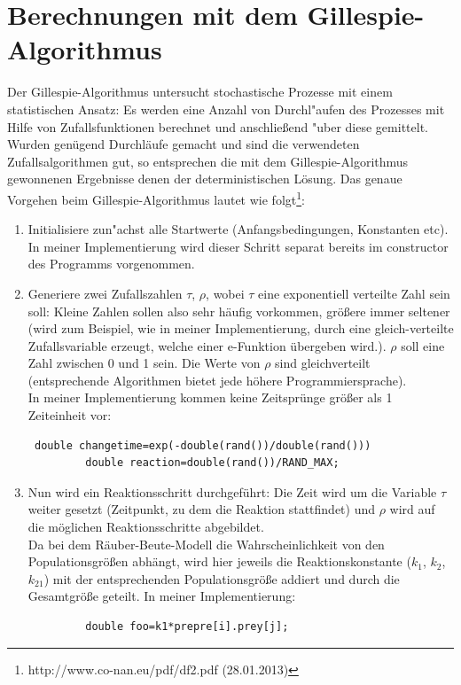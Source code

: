 \documentclass[11pt]{article}
\begin{document}
\section{Berechnungen mit dem Gillespie-Algorithmus}
Der Gillespie-Algorithmus untersucht stochastische Prozesse mit einem statistischen Ansatz: Es werden eine Anzahl von Durchl"aufen des Prozesses mit Hilfe von Zufallsfunktionen berechnet und anschließend "uber diese gemittelt. Wurden genügend Durchläufe gemacht und sind die verwendeten Zufallsalgorithmen gut, so entsprechen die mit dem Gillespie-Algorithmus gewonnenen Ergebnisse denen der deterministischen Lösung. Das genaue Vorgehen beim Gillespie-Algorithmus lautet wie folgt\footnote{http://www.co-nan.eu/pdf/df2.pdf (28.01.2013) }:
\begin{enumerate}
   \item Initialisiere zun"achst alle Startwerte (Anfangsbedingungen, Konstanten etc). In meiner Implementierung wird dieser Schritt separat bereits im constructor des Programms vorgenommen.
   \item Generiere zwei Zufallszahlen $\tau$, $\rho$, wobei $\tau$ eine exponentiell verteilte Zahl sein soll: Kleine Zahlen sollen also sehr häufig vorkommen, größere immer seltener (wird zum Beispiel, wie in meiner Implementierung, durch eine gleich-verteilte Zufallsvariable erzeugt, welche einer e-Funktion übergeben wird.). $\rho$ soll eine Zahl zwischen 0 und 1 sein. Die Werte von $\rho$ sind gleichverteilt (entsprechende Algorithmen bietet jede höhere Programmiersprache).\\
    In meiner Implementierung kommen keine Zeitsprünge größer als 1 Zeiteinheit vor:\\
          \begin{verbatim} double changetime=exp(-double(rand())/double(rand()))
         double reaction=double(rand())/RAND_MAX;\end{verbatim}
   \item Nun wird ein Reaktionsschritt durchgeführt: Die Zeit wird um die Variable $\tau$ weiter gesetzt (Zeitpunkt, zu dem die Reaktion stattfindet) und $\rho$ wird auf die möglichen Reaktionsschritte abgebildet. \\
   Da bei dem Räuber-Beute-Modell die Wahrscheinlichkeit von den Populationsgrößen abhängt, wird hier jeweils die Reaktionskonstante ($k_1$, $k_2$, $k_{21}$) mit der entsprechenden Populationsgröße addiert und durch die Gesamtgröße geteilt. In meiner Implementierung:
        \begin{verbatim}
         double foo=k1*prepre[i].prey[j];

\end{verbatim}
\end{enumerate}
\end{document}
